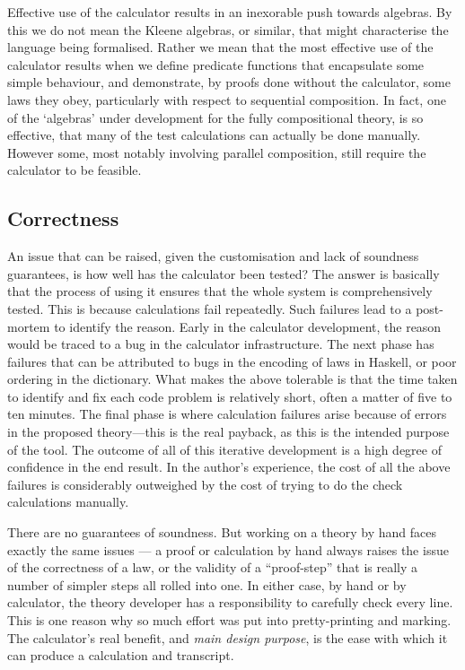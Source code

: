     Effective use of the calculator results in an inexorable
    push towards algebras. By this we do not mean the Kleene algebras,
    or similar, that might characterise the language being formalised.
    Rather we mean that the most effective use of the calculator results
    when we define predicate functions that encapsulate some simple
    behaviour, and demonstrate, by proofs done without the calculator,
    some laws they obey,
    particularly with respect to sequential composition.
    In fact, one of the `algebras' under development for the fully
    compositional theory, is so effective,
    that many of the test calculations
    can actually be done manually.
    However some, most notably involving parallel composition,
    still require the calculator to be feasible.

\subsection{Correctness}

    An issue that can be raised,
    given the customisation and lack of soundness guarantees,
    is how well has the calculator been tested?
    The answer is basically that the process of using it ensures
    that the whole system is comprehensively tested.
    This is because calculations fail repeatedly.
    Such failures lead to a post-mortem to identify the reason.
    Early in the calculator development,
    the reason would be traced to a bug in the calculator infrastructure.
    The next phase has failures that can be attributed
    to bugs in the encoding of laws in Haskell,
    or poor ordering in the dictionary.
    What makes the above tolerable is that the time taken to identify
    and fix each code problem is relatively short,
    often a matter of five to ten minutes.
    The final phase is where calculation failures arise because of errors
    in the proposed theory---this is the real payback,
    as this is the intended purpose of the tool.
    The outcome of all of this iterative development
    is a high degree of confidence in the end result.
    In the author's experience,
    the cost of all the above failures
    is considerably outweighed by the cost of
    trying to do the check calculations manually.

There are no guarantees of soundness.
But working on a theory by hand faces exactly the same issues
--- a proof or calculation by hand always raises the issue
of the correctness of a law, or the validity of a ``proof-step''
that is really a number of simpler steps all rolled into one.
In either case, by hand or by calculator,
the theory developer has a responsibility to carefully check every line.
This is one reason why so much effort was put into pretty-printing
and marking.
The calculator's real benefit, and\emph{ main design purpose},
is the ease with which
it can produce a calculation and transcript.


